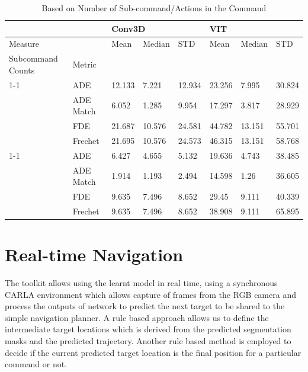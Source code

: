 \documentclass[11pt]{article}
\begin{document}
\begin{table}
\centering
\begin{tabular}{@{}llllllll@{}}
\toprule
                                         &           & \multicolumn{3}{l}{Conv3D} & \multicolumn{3}{l}{VIT}  \\ \midrule
Measure                                  &           & Mean    & Median  & STD    & Mean   & Median & STD    \\ 
\multicolumn{1}{l|}{Subcommand Counts}  & Metric    &         &         &        &        &        &        \\ \cline{1-1}
\multicolumn{1}{l|}{\multirow{4}{*}{1}} & ADE       & 12.133  & 7.221   & 12.934 & 23.256 & 7.995  & 30.824 \\
\multicolumn{1}{l|}{}                   & ADE Match & 6.052   & 1.285   & 9.954  & 17.297 & 3.817  & 28.929 \\
\multicolumn{1}{l|}{}                   & FDE       & 21.687  & 10.576  & 24.581 & 44.782 & 13.151 & 55.701 \\
\multicolumn{1}{l|}{}                   & Frechet   & 21.695  & 10.576  & 24.573 & 46.315 & 13.151 & 58.768 \\ \cline{1-1}
\multicolumn{1}{l|}{\multirow{4}{*}{2}} & ADE       & 6.427   & 4.655   & 5.132  & 19.636 & 4.743  & 38.485 \\
\multicolumn{1}{l|}{}                   & ADE Match & 1.914   & 1.193   & 2.494  & 14.598 & 1.26   & 36.605 \\
\multicolumn{1}{l|}{}                   & FDE       & 9.635   & 7.496   & 8.652  & 29.45  & 9.111  & 40.339 \\
\multicolumn{1}{l|}{}                   & Frechet   & 9.635   & 7.496   & 8.652  & 38.908 & 9.111  & 65.895 \\ \bottomrule
\end{tabular}
    \caption{Based on Number of Sub-command/Actions in the Command}
    \label{fig:ablations_4}
\end{table}

\section{Real-time Navigation}


The toolkit allows using the learnt model in real time, using a synchronous CARLA environment which allows capture of frames from the RGB camera and process the outputs of network to predict the next target to be shared to the simple navigation planner. A rule based approach allows us to define the intermediate target locations which is derived from the predicted segmentation masks and the predicted trajectory. Another rule based method is employed to decide if the current predicted target location is the final position for a particular command or not.
\end{document}
